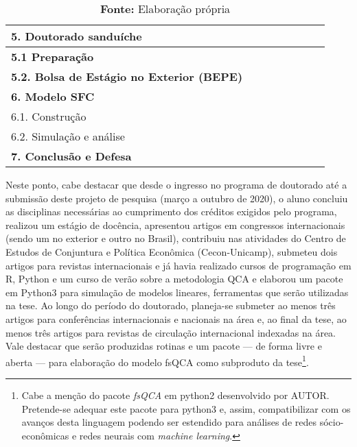 \begin{table}[hb]
{\begin{tabular}{ll|l|l|l|l|ll}
\textbf{5. Doutorado sanduíche}\footnotemark &&&&\cellcolor[HTML]{9B9B9B}&\cellcolor[HTML]{9B9B9B}& \\ \hline

\textbf{5.1 Preparação}\footnotemark &&&&\cellcolor[HTML]{9B9B9B}&& \\ \hline

\textbf{5.2. Bolsa de Estágio no Exterior (BEPE)}\footnotemark &&&&&\cellcolor[HTML]{9B9B9B}& \\ \hline
\textbf{6. Modelo SFC} &&&\cellcolor[HTML]{FF0000}&\cellcolor[HTML]{FF0000}&\cellcolor[HTML]{FF0000}&\cellcolor[HTML]{FF0000} \\ \hline
6.1. Construção &&&\cellcolor[HTML]{FF9933}&\cellcolor[HTML]{FF9933}&& \\ \hline
6.2. Simulação e análise &&&&&\cellcolor[HTML]{FF9933}&\cellcolor[HTML]{FF9933}\\ \hline

\textbf{7. Conclusão e Defesa} & & &  &  & & \cellcolor[HTML]{9B9B9B} \\ \hline \hline
		
	

\end{tabular}%
	\renewcommand{\arraystretch}{0.4}
	}
\caption*{\textbf{Fonte:} Elaboração própria}
\end{table}

Neste ponto, cabe destacar que desde o ingresso no programa de doutorado até a
submissão deste projeto de pesquisa (março a outubro de 2020), o aluno concluiu as disciplinas necessárias ao cumprimento dos créditos exigidos pelo programa, realizou um estágio de docência, apresentou artigos em congressos
internacionais (sendo um no exterior e outro no Brasil), contribuiu nas atividades do Centro de Estudos de Conjuntura e Política Econômica (Cecon-Unicamp),
 submeteu dois artigos para revistas internacionais e já havia realizado cursos de programação em R, Python e um curso de verão sobre a metodologia QCA e elaborou um pacote em Python3 para simulação de modelos lineares, ferramentas que serão utilizadas na tese. 
 Ao longo do período do doutorado, planeja-se submeter ao menos três artigos para conferências internacionais e nacionais
 na área e, ao final da tese, ao menos três artigos para revistas de circulação internacional indexadas na área.
 Vale destacar que serão produzidas rotinas e um pacote --- de forma livre e aberta --- para elaboração do modelo fsQCA como subproduto da tese\footnote{
 	Cabe a menção do pacote \textit{fsQCA} em python2 desenvolvido por AUTOR. Pretende-se adequar este pacote para python3 e, assim, compatibilizar com os avanços desta linguagem podendo ser estendido para análises de redes sócio-econômicas e redes neurais com \textit{machine learning}.
 }.
 



\begin{comment}

\end{comment}




